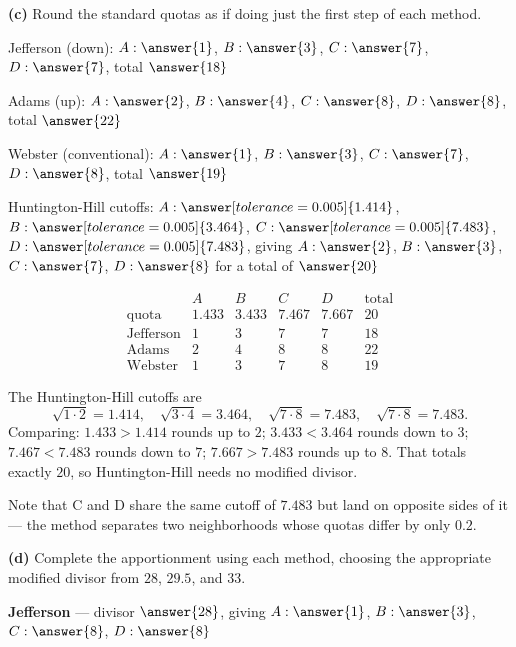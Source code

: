\documentclass[12pt]{ximera}
\begin{document}
\begin{problem}
\begin{prompt}
\textbf{(c)} Round the standard quotas as if doing just the first step of each method.

Jefferson (down): $A: \answer{1}$, $B: \answer{3}$, $C: \answer{7}$, $D: \answer{7}$,
total $\answer{18}$

\smallskip
Adams (up): $A: \answer{2}$, $B: \answer{4}$, $C: \answer{8}$, $D: \answer{8}$,
total $\answer{22}$

\smallskip
Webster (conventional): $A: \answer{1}$, $B: \answer{3}$, $C: \answer{7}$, $D: \answer{8}$,
total $\answer{19}$

\smallskip
Huntington-Hill cutoffs: $A: \answer[tolerance=0.005]{1.414}$,
$B: \answer[tolerance=0.005]{3.464}$, $C: \answer[tolerance=0.005]{7.483}$,
$D: \answer[tolerance=0.005]{7.483}$, giving $A: \answer{2}$, $B: \answer{3}$,
$C: \answer{7}$, $D: \answer{8}$ for a total of $\answer{20}$

\begin{feedback}
\[
\begin{array}{lccccl}
 & A & B & C & D & \text{total}\\
\text{quota} & 1.433 & 3.433 & 7.467 & 7.667 & 20\\
\text{Jefferson} & 1 & 3 & 7 & 7 & 18\\
\text{Adams} & 2 & 4 & 8 & 8 & 22\\
\text{Webster} & 1 & 3 & 7 & 8 & 19
\end{array}
\]

The Huntington-Hill cutoffs are
\[
\sqrt{1\cdot 2}=1.414, \quad \sqrt{3\cdot 4}=3.464, \quad \sqrt{7\cdot 8}=7.483,
\quad \sqrt{7\cdot 8}=7.483.
\]
Comparing: $1.433 > 1.414$ rounds up to $2$; $3.433 < 3.464$ rounds down to $3$;
$7.467 < 7.483$ rounds down to $7$; $7.667 > 7.483$ rounds up to $8$. That totals exactly
$20$, so Huntington-Hill needs no modified divisor.

Note that C and D share the same cutoff of $7.483$ but land on opposite sides of it ---
the method separates two neighborhoods whose quotas differ by only $0.2$.
\end{feedback}
\end{prompt}

\begin{prompt}
\textbf{(d)} Complete the apportionment using each method, choosing the appropriate
modified divisor from $28$, $29.5$, and $33$.

\textbf{Jefferson} --- divisor $\answer{28}$, giving $A: \answer{1}$, $B: \answer{3}$,
$C: \answer{8}$, $D: \answer{8}$


\end{prompt}
\end{problem}
\end{document}
